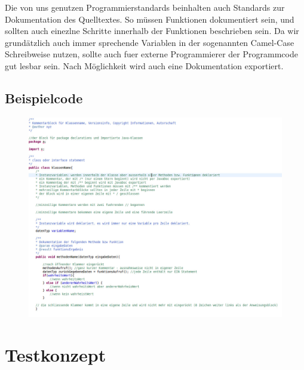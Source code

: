 \documentclass[11pt,a4paper]{article}
\begin{document}
Die von uns genutzen Programmierstandards beinhalten auch Standards zur Dokumentation des Quelltextes. So müssen Funktionen dokumentiert sein, und sollten auch einezlne Schritte innerhalb der Funktionen beschrieben sein. Da wir grundätzlich auch immer sprechende Variablen in der sogenannten Camel-Case Schreibweise nutzen, sollte auch fuer externe Programmierer der Programmcode gut lesbar sein. Nach Möglichkeit wird auch eine Dokumentation exportiert.

\subsection{Beispielcode}

\begin{figure}[htb]
  \centering
  \includegraphics[scale=0.3]{Unbenannt.jpg}
  \label{PNFs}
\end{figure} 



\section{Testkonzept}
\end{document}
